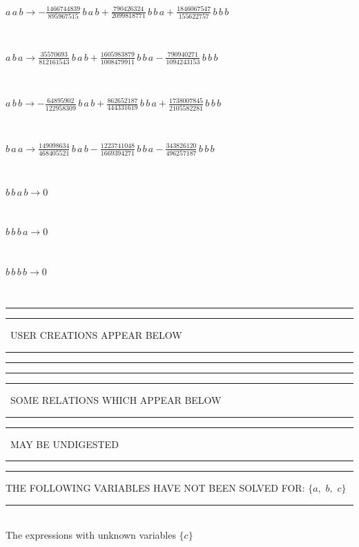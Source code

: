\begin{minipage}{6in}
$
a\,
 a\,
 b\rightarrow -\frac{1466744839}{895967515}\,
 b\,
 a\,
 b + \frac{790426324}{2099818771}\,
 b\,
 b\,
 a + \frac{1846067547}{155622757}\,
 b\,
 b\,
 b
$
\end{minipage}\medskip \\
\begin{minipage}{6in}
$
a\,
 b\,
 a\rightarrow \frac{35570693}{812161543}\,
 b\,
 a\,
 b + \frac{1605983879}{1008479911}\,
 b\,
 b\,
 a - \frac{790940271}{1094243153}\,
 b\,
 b\,
 b
$
\end{minipage}\medskip \\
\begin{minipage}{6in}
$
a\,
 b\,
 b\rightarrow -\frac{64895902}{122958309}\,
 b\,
 a\,
 b + \frac{862652187}{444331619}\,
 b\,
 b\,
 a + \frac{1738007845}{2105582281}\,
 b\,
 b\,
 b
$
\end{minipage}\medskip \\
\begin{minipage}{6in}
$
b\,
 a\,
 a\rightarrow \frac{149098634}{468405521}\,
 b\,
 a\,
 b - \frac{1223741048}{1669394271}\,
 b\,
 b\,
 a - \frac{343826120}{496257187}\,
 b\,
 b\,
 b
$
\end{minipage}\medskip \\
\begin{minipage}{6in}
$
b\,
 b\,
 a\,
 b\rightarrow 0
$
\end{minipage}\medskip \\
\begin{minipage}{6in}
$
b\,
 b\,
 b\,
 a\rightarrow 0
$
\end{minipage}\medskip \\
\begin{minipage}{6in}
$
b\,
 b\,
 b\,
 b\rightarrow 0
$
\end{minipage}\\
\rule[2pt]{6in}{1pt}\hfil\break
\rule[2.5pt]{1.701in}{1pt}
\ USER CREATIONS APPEAR BELOW\ 
\rule[2.5pt]{1.701in}{1pt}\hfil\break
\rule[2pt]{6in}{1pt}\hfil\break
\rule[2pt]{6in}{4pt}\hfil\break
\rule[2pt]{1.45in}{4pt}
\ SOME RELATIONS WHICH APPEAR BELOW\ 
\rule[2pt]{1.45in}{4pt}\hfil\break
\rule[2pt]{2.18in}{4pt}
\ MAY BE UNDIGESTED\ 
\rule[2pt]{2.18in}{4pt}\hfil\break
\rule[2pt]{6in}{4pt}\hfil\break
THE FOLLOWING VARIABLES HAVE NOT BEEN SOLVED FOR:\hfil\break
$\{a,
$ $
b,
$ $
c\}$
\smallskip\\
\rule[3pt]{6in}{.7pt}\\
The expressions with unknown variables $\{c\}$\\

